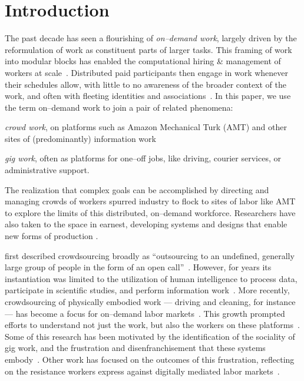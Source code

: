\documentclass[trackingWork]{subfiles}
\begin{document}
\section{Introduction}\label{sec:introduction}
{The past decade has seen a flourishing of \textit{on--demand work},
largely driven by the reformulation of work as
constituent parts of larger tasks.}
This framing of work into modular blocks
has enabled the computational hiring \& management of workers at scale~\cite{howe2008crowdsourcing,Bigham2014,crowdworkFuture}.
Distributed paid participants then engage in work whenever their schedules allow,
with little to no awareness of the broader context of the work, and
often with fleeting identities and associations~\cite{martin2014being,uberAlgorithm}.
In this paper, we use the term on--demand work to join a pair of related phenomena:
\begin{numberlist}[itemjoin*={;~and~},itemjoin={;~}]
\item \textit{crowd work}, on platforms such as Amazon Mechanical Turk (AMT) and other sites of (predominantly) information work
\item \textit{gig work}, often as platforms for one--off jobs, like driving, courier services, or administrative support.
\end{numberlist}
The realization that complex goals can be accomplished by directing and managing crowds of workers spurred industry to flock to sites of labor
like AMT to explore the limits of this distributed, on--demand workforce.
Researchers have also taken to the space in earnest,
developing systems and designs that enable new forms of production
\cite[e.g.][]{bernsteinSoylent,vizwiz,paolacci2010running}.

\citeauthor{howe2008crowdsourcing} first described crowdsourcing broadly as
``outsourcing to an undefined, generally large group of people in the form of an open call''~\cite{howe2008crowdsourcing}.
However, for years its instantiation was limited to the utilization of
human intelligence to process data, participate in scientific studies, and perform information work~\cite{CrowdsourcingUserStudies,movieSummarizationWu,
      yuenSurvey,geiger2011managing,quinnbedersonTaxonomy}.
More recently, crowdsourcing of physically embodied work
--- driving and cleaning, for instance ---
has become a focus for on--demand labor markets~\cite{uberAlgorithm,uberOfficial,zaarlyOfficial,taskrabbitOfficial}.
This growth prompted efforts to understand not just the work, but also the workers on these platforms~\cite{Ross,whoareNOTtheTurkers}.
Some of this research has been motivated by the identification of the sociality of gig work,
and the frustration and disenfranchisement that these systems embody~\cite{turkopticon,martin2014being,takingAHITMcInnis}.
Other work has focused on the outcomes of this frustration,
reflecting on the resistance workers express against digitally mediated labor markets~\cite{uberAlgorithm,dynamo}.
\end{document}
